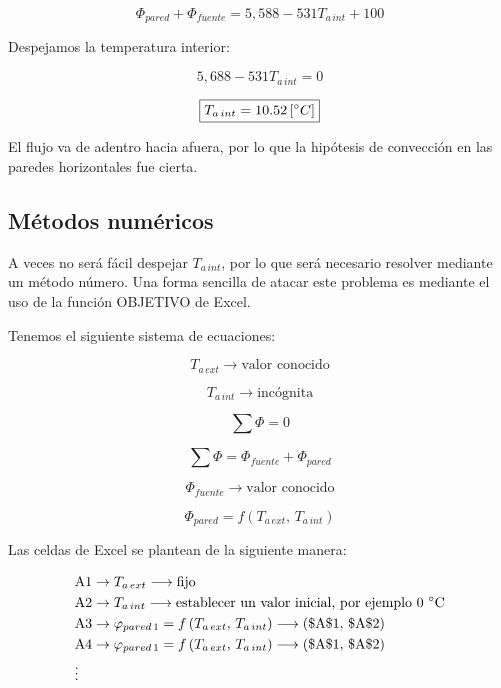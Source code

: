 \documentclass[12pt]{article}
\begin{document}
\[ \Phi _{ pared } + \Phi _{ fuente } = 5,588 -531 T_{ a \, int } + 100 \]

Despejamos la temperatura interior: 

\[ 5,688 - 531 T_{ a \, int } = 0 \]

\[ \boxed{
    T_{ a \, int } = 10.52 \left[ \degree C \right]
} \]

El flujo va de adentro hacia afuera, por lo que la hipótesis de convección en las paredes horizontales fue cierta.

\subsection*{Métodos numéricos}

A veces no será fácil despejar $ T_{ a \, int} $, por lo que será necesario resolver mediante un método número. Una forma sencilla de atacar este problema es mediante el uso de la función OBJETIVO de Excel.

Tenemos el siguiente sistema de ecuaciones:

\[ T_{ a \, ext } \longrightarrow \text{valor conocido} \]

\[ T_{ a \, int } \longrightarrow \text{incógnita} \]

\[ \sum{ \Phi } = 0 \]

\[ \sum{ \Phi } = \Phi _{ fuente } + \Phi _{ pared } \]

\[ \Phi _{ fuente } \longrightarrow \text{valor conocido} \]

\[ \Phi _{ pared } = f \left( T_{ a \, ext }, \, T_{ a \, int } \right) \]

Las celdas de Excel se plantean de la siguiente manera:


\[ \begin{aligned}
    & \mathrm{A} 1 \rightarrow T_{ a \, ext } \longrightarrow \text{fijo} \\
    & \mathrm{A} 2 \rightarrow T_{ a \, int } \longrightarrow \text{establecer un valor inicial, por ejemplo 0 \degree C} \\
    & \mathrm{A} 3 \rightarrow \varphi _{ pared \, 1 } = f \left( T_{ a \, ext }, \, T_{ a \, int } \right) \longrightarrow  \left( \$ \mathrm{A} \$ 1, \, \$ \mathrm{A} \$ 2 \right) \\
    & \mathrm{A} 4 \rightarrow \varphi _{ pared \, 1 } = f \left( T_{ a \, ext }, \, T_{ a \, int } \right) \longrightarrow  \left( \$ \mathrm{A} \$ 1, \, \$ \mathrm{A} \$ 2 \right) \\
    & \vdots
\end{aligned} \]

\[ \]

\[ \]

\end{document}
